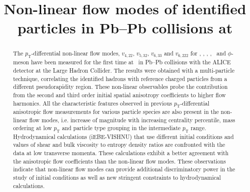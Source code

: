 \documentclass[ALICE,manyauthors]{cernphprep}
\begin{document}


\begin{titlepage}

\title{Non-linear flow modes of identified particles in Pb--Pb collisions at \sNN}


\begin{abstract}
\noindent The $p_{\mathrm{T}}$-differential non-linear flow modes, $v_{4,22}$, $v_{5,32}$, $v_{6,33}$ and $v_{6,222}$ for \pion, \kaon, \Ks, \proton, \lambdas~and $\phi$-meson have been measured for the first time at \sNN~in Pb--Pb collisions with the ALICE detector at the Large Hadron Collider. The results were obtained with a multi-particle technique, correlating the identified hadrons with reference charged particles from a different pseudorapidity region. 
These non-linear observables probe the contribution from the second and third order initial spatial anisotropy coefficients to higher flow harmonics. All the characteristic features observed in previous $p_{\mathrm{T}}$-differential anisotropic flow measurements for various particle species are also present in the non-linear flow modes, i.e. increase of magnitude with increasing centrality percentile, mass ordering at low $p_{\mathrm{T}}$ and particle type grouping in the intermediate $p_{\mathrm{T}}$ range. Hydrodynamical calculations (iEBE-VISHNU) that use different initial conditions and values of shear and bulk viscosity to entropy density ratios are confronted with the data at low transverse momenta. These calculations exhibit a better agreement with the anisotropic flow coefficients than the non-linear flow modes. These observations indicate that non-linear flow modes can provide additional discriminatory power in the study of initial conditions as well as new stringent constraints to hydrodynamical calculations.

\end{abstract}
\end{titlepage}
\end{document}
